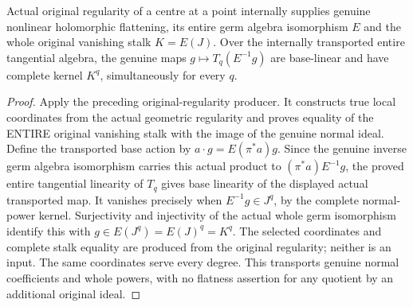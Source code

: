\begin{theorem}
\label{hir:relative-normal-original-centre-taylor-kernel}
\leanok
Actual original regularity of a centre at a point internally supplies genuine
nonlinear holomorphic flattening, its entire germ algebra isomorphism $E$ and
the whole original vanishing stalk $K=E(J)$. Over the internally transported
entire tangential algebra, the genuine maps $g\mapsto T_q(E^{-1}g)$ are
base-linear and have complete kernel $K^q$, simultaneously for every $q$.
\end{theorem}
\begin{proof}
Apply the preceding original-regularity producer. It constructs true local
coordinates from the actual geometric regularity and proves equality of the
ENTIRE original vanishing stalk with the image of the genuine normal ideal.
Define the transported base action by $a\cdot g=E(\pi^*a)g$. Since the genuine
inverse germ algebra isomorphism carries this actual product to
$(\pi^*a)E^{-1}g$, the proved entire tangential linearity of $T_q$ gives base
linearity of the displayed actual transported map. It vanishes precisely when
$E^{-1}g\in J^q$, by the complete normal-power kernel. Surjectivity and
injectivity of the actual whole germ isomorphism identify this with
$g\in E(J^q)=E(J)^q=K^q$. The selected coordinates and complete stalk equality
are produced from the original regularity; neither is an input. The same
coordinates serve every degree. This transports genuine normal coefficients
and whole powers, with no flatness assertion for any quotient by an additional
original ideal.
\end{proof}
